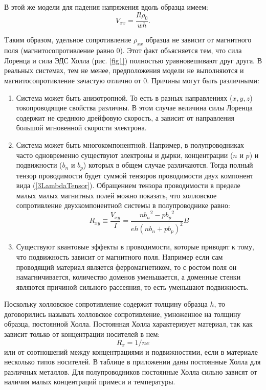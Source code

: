 В этой же модели для падения напряжения вдоль образца имеем:
\begin{equation}
V_{xx}=\frac{Il\rho_{0}}{wh}.
\label{3DiagonalVoltage}
\end{equation}

Tаким образом, удельное сопротивление $\rho_{xx}$ образца не зависит от магнитного поля (магнитосопротивление равно 0). Этот факт объясняется тем, что сила Лоренца и сила ЭДС Холла (рис. \ref{fig1}) полностью уравновешивают друг друга. В реальных системах, тем не менее, предположения модели не выполняются и магнитосопротивление зачастую отлично от 0. Причины могут быть различными:
\begin{enumerate}
\item{Система может быть анизотропной. То есть в разных направлениях ($x,y,z$) токопроводящие свойства различны. В этом случае величина силы Лоренца содержит не среднюю дрейфовую скорость, а зависит от направления большой мгновенной скорости электрона.}

\item{Система может быть многокомпонентной. Например, в полупроводниках часто одновременно существуют электроны и дырки, концентрации ($n$ и $p$) и подвижности ($b_n$ и $b_p$) которых в общем случае различаются. Тогда полный тензор проводимости будет суммой тензоров проводимости двух компонент вида (\ref{3LambdaTensor}). Обращением тензора проводимости в пределе малых малых магнитных полей можно показать, что холловское сопротивление двухкомпонентной системы в полупроводнике равно:
      \begin{equation}
      R_{xy}\equiv \frac{V_{xy}}{I}=\frac{n{b_n}^2-p{b_p}^2}{eh(nb_n+pb_p)^2}B
      \label{3HallTwoComponents}
      \end{equation}
      }

\item{Существуют квантовые эффекты в проводимости, которые приводят к тому, что подвижность зависит от магнитного поля. Например если сам проводящий материал является ферромагнетиком, то с ростом поля он намагничивается, количество доменов уменьшается, а доменные стенки являются причиной сильного рассеяния, то есть уменьшают подвижность. }
\end{enumerate}

Поскольку холловское сопротивление содержит толщину образца $h$, то договорились называть холловское сопротивление, умноженное на толщину образца, постоянной Холла. Постоянная Холла характеризует материал, так как зависит только от концентрации носителей в нем:
$$
R_x=1/ne
$$
 или от соотношений между концентрациями и подвижностями, если в материале несколько типов носителей. В таблице в приложении даны постоянные Холла для различных металлов. Для полупроводников постоянные Холла сильно зависят от наличия малых концентраций примеси и температуры.

